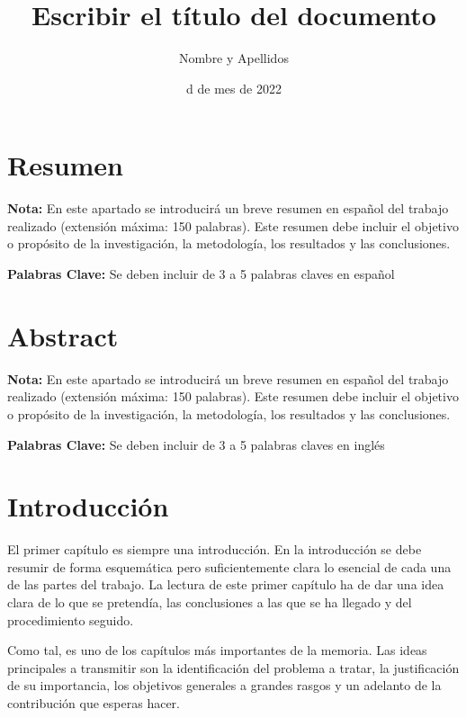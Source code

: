 \documentclass[11pt,a4paper,spanish]{book}
\title{Escribir el título del documento}
\author{Nombre y Apellidos}
\date{d de mes de 2022}
\begin{document}
\renewcommand{\listfigurename}{Índice de Ilustraciones}
\renewcommand{\listtablename}{Índice de Tablas}
\renewcommand{\contentsname}{Índice de Contenidos}
\renewcommand{\figurename}{Figura}
\renewcommand{\tablename}{Tabla} 

\maketitle

\frontmatter
\tableofcontents
\listoffigures
\listoftables

\chapter{Resumen}
{\bf Nota:} En este apartado se introducirá un breve resumen en español del trabajo realizado (extensión máxima: 150 palabras). Este resumen debe incluir el objetivo o propósito de la investigación, la metodología, los resultados y las conclusiones.


{\bf Palabras Clave:} Se deben incluir de 3 a 5 palabras claves en español

\chapter{Abstract}
{\bf Nota:} En este apartado se introducirá un breve resumen en español del trabajo realizado (extensión máxima: 150 palabras). Este resumen debe incluir el objetivo o propósito de la investigación, la metodología, los resultados y las conclusiones.


{\bf Palabras Clave:} Se deben incluir de 3 a 5 palabras claves en inglés




\mainmatter
\chapter{Introducción}

El primer capítulo es siempre una introducción. En la introducción se debe resumir de forma esquemática pero suficientemente clara lo esencial de cada una de las partes del trabajo. La lectura de este primer capítulo ha de dar una idea clara de lo que se pretendía, las conclusiones a las que se ha llegado y del procedimiento seguido.

Como tal, es uno de los capítulos más importantes de la memoria. Las ideas principales a transmitir son la identificación del problema a tratar, la justificación de su importancia, los objetivos generales a grandes rasgos y un adelanto de la contribución que esperas hacer.
\end{document}
